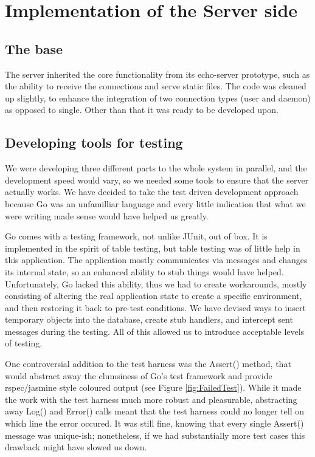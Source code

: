 \documentclass{l3proj}
\begin{document}
\section{Implementation of the Server side}

\subsection{The base}

The server inherited the core functionality from its echo-server prototype, such as the ability to receive the connections and serve static files. The code was cleaned up slightly, to enhance the integration of two connection types (user and daemon) as opposed to single. Other than that it was ready to be developed upon.

\subsection{Developing tools for testing}

We were developing three different parts to the whole system in parallel, and the development speed would vary, so we needed some tools to ensure that the server actually works. We have decided to take the test driven development approach because Go was an unfamilliar language and every little indication that what we were writing made sense would have helped us greatly.

Go comes with a testing framework, not unlike JUnit, out of box. It is implemented in the spirit of table testing, but table testing was of little help in this application. The application mostly communicates via messages and changes its internal state, so an enhanced ability to stub things would have helped. Unfortunately, Go lacked this ability, thus we had to create workarounds, mostly consisting of altering the real application state to create a specific environment, and then restoring it back to pre-test conditions. We have devised ways to insert temporary objects into the database, create stub handlers, and intercept sent messages during the testing. All of this allowed us to introduce acceptable levels of testing.

One controversial addition to the test harness was the Assert() method, that would abstract away the clumsiness of Go's test framework and provide rspec/jasmine style coloured output (see Figure \ref{fig:FailedTest}). While it made the work with the test harness much more robust and pleasurable, abstracting away Log() and Error() calls meant that the test harness could no longer tell on which line the error occured. It was still fine, knowing that every single Assert() message was unique-ish; nonetheless, if we had substantially more test cases this drawback might have slowed us down.
\end{document}
